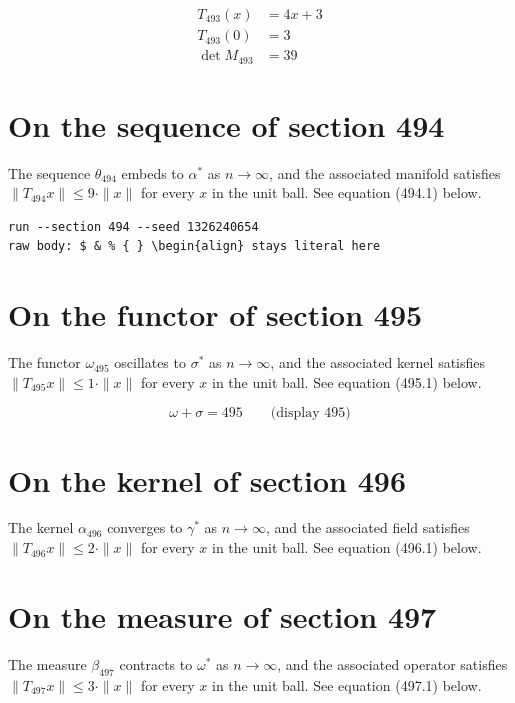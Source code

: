 \documentclass{article}
\begin{document}
\begin{align}
T_{493}(x) &= 4 x + 3 \\
T_{493}(0) &= 3 \\
\det M_{493} &= 39
\end{align}

\section{On the sequence of section 494}
The sequence $\theta_{494}$ embeds to $\alpha^{*}$ as $n \to \infty$,
and the associated manifold satisfies $\|T_{494} x\| \leq 9 \cdot \|x\|$
for every $x$ in the unit ball. See equation (494.1) below.

\begin{verbatim}
run --section 494 --seed 1326240654
raw body: $ & % { } \begin{align} stays literal here
\end{verbatim}

\section{On the functor of section 495}
The functor $\omega_{495}$ oscillates to $\sigma^{*}$ as $n \to \infty$,
and the associated kernel satisfies $\|T_{495} x\| \leq 1 \cdot \|x\|$
for every $x$ in the unit ball. See equation (495.1) below.

$$
\omega + \sigma = 495 \qquad \text{(display 495)}
$$

\section{On the kernel of section 496}
The kernel $\alpha_{496}$ converges to $\gamma^{*}$ as $n \to \infty$,
and the associated field satisfies $\|T_{496} x\| \leq 2 \cdot \|x\|$
for every $x$ in the unit ball. See equation (496.1) below.

\section{On the measure of section 497}
The measure $\beta_{497}$ contracts to $\omega^{*}$ as $n \to \infty$,
and the associated operator satisfies $\|T_{497} x\| \leq 3 \cdot \|x\|$
for every $x$ in the unit ball. See equation (497.1) below.
\end{document}
